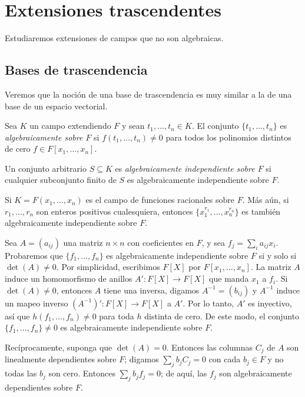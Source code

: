 \chapter{Extensiones trascendentes}

Estudiaremos extensiones de campos que no son algebraicas.



\section{Bases de trascendencia}

Veremos que la noción de una base de trascendencia es muy similar a la de una base de un espacio vectorial.

\begin{definition}
  Sea $K$ un campo extendiendo $F$ y sean $t_1, \ldots, t_n \in K$. El conjunto $\{t_1, \ldots, t_n\}$ es \emph{algebraicamente sobre $F$} si $f(t_1,\ldots,t_n) \neq 0$ para todos los polinomios distintos de cero $f\in F[x_1,\ldots, x_n]$.

  Un conjunto arbitrario $S \subseteq K$ es \emph{algebraicamente independiente sobre $F$} si cualquier subconjunto finito de $S$ es algebraicamente independiente sobre $F$.
\end{definition}

\begin{example}
  Si $K=F(x_1, \ldots, x_n)$ es el campo de funciones racionales sobre $F$. Más aún, si $r_1,\ldots, r_n$ son enteros positivos cualesquiera, entonces $\{x_1^{r_1},\ldots, x_n^{r_n}\}$ es también algebraicamente independiente sobre $F$.
\end{example}

\begin{example}
  Sea $A=(a_{ij})$ una matriz $n \times n$ con coeficientes en $F$, y sea $f_j= \sum_i a_{ij}x_i$. Probaremos que $\{f_1,\ldots, f_n\}$ es algebraicamente independiente sobre $F$ si y solo si $\det(A)\neq 0$. Por simplicidad, escribimos $F[X]$ por $F[x_1, \ldots, x_n]$. La matriz $A$ induce un homomorfismo de anillos $A'\colon F[X] \to F[X]$ que manda $x_1$ a $f_i$. Si $\det(A)\neq 0$, entonces $A$ tiene una inversa, digamos $A^{-1}=(b_{ij})$ y $A^{-1}$ induce un mapeo inverso $(A^{-1})'\colon F[X]\to F[X]$ a $A'$. Por lo tanto, $A'$ es inyectivo, así que $h(f_1, \ldots, f_n) \neq 0$ para toda $h$ distinta de cero. De este modo, el conjunto $\{f_1, \ldots, f_n\}\neq 0$ es algebraicamente independiente sobre $F$.

  Recíprocamente, suponga que $\det(A)=0$. Entonces las columnas $C_j$ de $A$ son linealmente dependientes sobre $F$; digamos $\sum_j b_j C_j = 0$ con cada $b_j \in F$ y no todas las $b_j$ son cero. Entonces $\sum_j b_j f_j = 0$; de aquí, las $f_j$ son algebraicamente dependientes sobre $F$.
\end{example}

